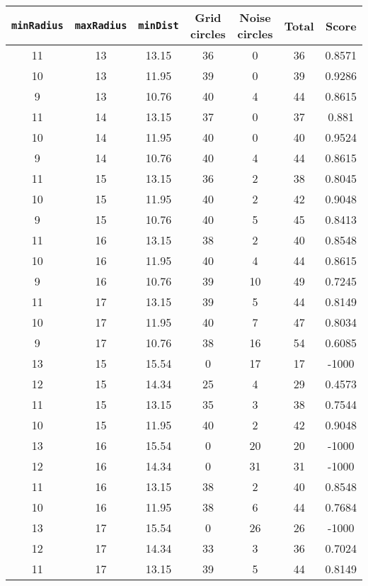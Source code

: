 \documentclass[letterpaper, 12pt]{article}
\begin{document}
\begin{longtable}{|c|c|c|c|c|c|c|}
\hline
\textbf{\texttt{minRadius}} & \textbf{\texttt{maxRadius}} & \textbf{\texttt{minDist}} & \textbf{Grid circles} & \textbf{Noise circles} & \textbf{Total} & \textbf{Score} \\
\hline
11 & 13 & 13.15 & 36 & 0 & 36 & 0.8571 \\
\hline
10 & 13 & 11.95 & 39 & 0 & 39 & 0.9286 \\
\hline
9 & 13 & 10.76 & 40 & 4 & 44 & 0.8615 \\
\hline
11 & 14 & 13.15 & 37 & 0 & 37 & 0.881 \\
\hline
10 & 14 & 11.95 & 40 & 0 & 40 & 0.9524 \\
\hline
9 & 14 & 10.76 & 40 & 4 & 44 & 0.8615 \\
\hline
11 & 15 & 13.15 & 36 & 2 & 38 & 0.8045 \\
\hline
10 & 15 & 11.95 & 40 & 2 & 42 & 0.9048 \\
\hline
9 & 15 & 10.76 & 40 & 5 & 45 & 0.8413 \\
\hline
11 & 16 & 13.15 & 38 & 2 & 40 & 0.8548 \\
\hline
10 & 16 & 11.95 & 40 & 4 & 44 & 0.8615 \\
\hline
9 & 16 & 10.76 & 39 & 10 & 49 & 0.7245 \\
\hline
11 & 17 & 13.15 & 39 & 5 & 44 & 0.8149 \\
\hline
10 & 17 & 11.95 & 40 & 7 & 47 & 0.8034 \\
\hline
9 & 17 & 10.76 & 38 & 16 & 54 & 0.6085 \\
\hline
13 & 15 & 15.54 & 0 & 17 & 17 & -1000 \\
\hline
12 & 15 & 14.34 & 25 & 4 & 29 & 0.4573 \\
\hline
11 & 15 & 13.15 & 35 & 3 & 38 & 0.7544 \\
\hline
10 & 15 & 11.95 & 40 & 2 & 42 & 0.9048 \\
\hline
13 & 16 & 15.54 & 0 & 20 & 20 & -1000 \\
\hline
12 & 16 & 14.34 & 0 & 31 & 31 & -1000 \\
\hline
11 & 16 & 13.15 & 38 & 2 & 40 & 0.8548 \\
\hline
10 & 16 & 11.95 & 38 & 6 & 44 & 0.7684 \\
\hline
13 & 17 & 15.54 & 0 & 26 & 26 & -1000 \\
\hline
12 & 17 & 14.34 & 33 & 3 & 36 & 0.7024 \\
\hline
11 & 17 & 13.15 & 39 & 5 & 44 & 0.8149 \\

\end{longtable}
\end{document}
